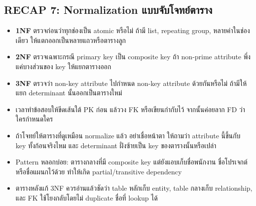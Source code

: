 \documentclass[a4paper,12pt]{article}
\begin{document}
\subsection*{RECAP 7: Normalization แบบจับโจทย์ตาราง}
\begin{itemize}
    \item \textbf{1NF} ตรวจก่อนว่าทุกช่องเป็น atomic หรือไม่ ถ้ามี list, repeating group, หลายค่าในช่องเดียว ให้แตกออกเป็นหลายแถวหรือตารางลูก
    \item \textbf{2NF} ตรวจเฉพาะกรณี primary key เป็น composite key ถ้า non-prime attribute พึ่งแค่บางส่วนของ key ให้แยกตารางออก
    \item \textbf{3NF} ตรวจว่า non-key attribute ไปกำหนด non-key attribute ด้วยกันหรือไม่ ถ้ามีให้แยก determinant นั้นออกเป็นตารางใหม่
    \item เวลาทำข้อสอบให้ขีดเส้นใต้ PK ก่อน แล้ววง FK หรือเขียนกำกับไว้ จากนั้นค่อยลาก FD ว่าใครกำหนดใคร
    \item ถ้าโจทย์ให้ตารางที่ดูเหมือน normalize แล้ว อย่าเชื่อหน้าตา ให้ถามว่า attribute นี้ขึ้นกับ key ทั้งก้อนจริงไหม และ determinant ฝั่งซ้ายเป็น key ของตารางนั้นหรือเปล่า
    \item Pattern หลอกบ่อย: ตารางกลางที่มี composite key แต่ยังแอบเก็บชื่อพนักงาน ชื่อโปรเจกต์ หรือชื่อแผนกไว้ด้วย ทำให้เกิด partial/transitive dependency
    \item ตารางหลังแก้ 3NF ควรอ่านแล้วชัดว่า table หลักเก็บ entity, table กลางเก็บ relationship, และ FK ใช้โยงกลับโดยไม่ duplicate ชื่อที่ lookup ได้
\end{itemize}
\end{document}
